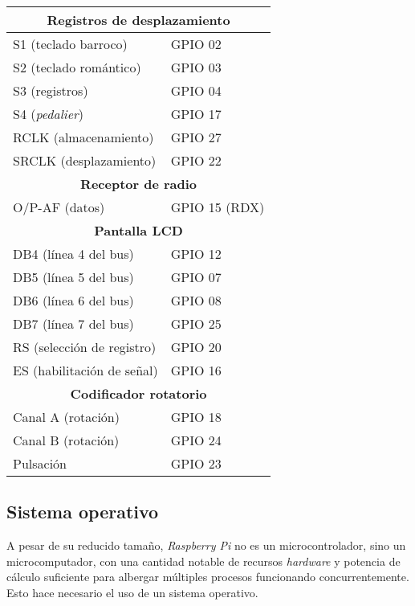 \begin{center}
	\begin{tabular}{|l|l|}
		\hline \multicolumn{2}{|c|}{\textbf{Registros de desplazamiento}} \\
		\hline S1 (teclado barroco) & GPIO 02 \\ 
		\hline S2 (teclado romántico) & GPIO 03 \\ 
		\hline S3 (registros) & GPIO 04 \\ 
		\hline S4 (\textit{pedalier}) & GPIO 17 \\ 
		\hline RCLK (almacenamiento) & GPIO 27 \\ 
		\hline SRCLK (desplazamiento) & GPIO 22 \\ 
		\hline \multicolumn{2}{|c|}{\textbf{Receptor de radio}} \\
		\hline O/P-AF (datos) & GPIO 15 (RDX) \\ 
		\hline \multicolumn{2}{|c|}{\textbf{Pantalla LCD}} \\
		\hline DB4 (línea 4 del bus) & GPIO 12 \\ 
		\hline DB5 (línea 5 del bus) & GPIO 07 \\ 
		\hline DB6 (línea 6 del bus) & GPIO 08 \\ 
		\hline DB7 (línea 7 del bus) & GPIO 25 \\
		\hline RS (selección de registro) & GPIO 20 \\ 
		\hline ES (habilitación de señal) & GPIO 16 \\ 
		\hline \multicolumn{2}{|c|}{\textbf{Codificador rotatorio}} \\
		\hline Canal A (rotación) & GPIO 18 \\ 
		\hline Canal B (rotación) & GPIO 24 \\ 
		\hline Pulsación & GPIO 23 \\ 
		\hline 
	\end{tabular} 
\end{center}

\subsection{Sistema operativo}

A pesar de su reducido tamaño, \textit{Raspberry Pi} no es un microcontrolador, sino un microcomputador, con una cantidad notable de recursos \textit{hardware} y potencia de cálculo suficiente para albergar múltiples procesos funcionando concurrentemente. Esto hace necesario el uso de un sistema operativo.

